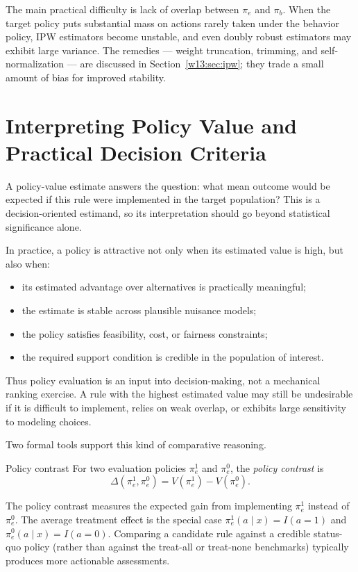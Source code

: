 \documentclass[master.tex]{subfiles}
\begin{document}
The main practical difficulty is lack of overlap between $\pi_e$ and $\pi_b$.  When the target policy puts substantial mass on actions rarely taken under the behavior policy, IPW estimators become unstable, and even doubly robust estimators may exhibit large variance.  The remedies --- weight truncation, trimming, and self-normalization --- are discussed in Section~\ref{w13:sec:ipw}; they trade a small amount of bias for improved stability.

\section{Interpreting Policy Value and Practical Decision Criteria}
\label{w13:sec:interpretation}

A policy-value estimate answers the question: what mean outcome would be expected if this rule were implemented in the target population?  This is a decision-oriented estimand, so its interpretation should go beyond statistical significance alone.

In practice, a policy is attractive not only when its estimated value is high, but also when:
\begin{itemize}
  \item its estimated advantage over alternatives is practically meaningful;
  \item the estimate is stable across plausible nuisance models;
  \item the policy satisfies feasibility, cost, or fairness constraints;
  \item the required support condition is credible in the population of interest.
\end{itemize}
Thus policy evaluation is an input into decision-making, not a mechanical ranking exercise.  A rule with the highest estimated value may still be undesirable if it is difficult to implement, relies on weak overlap, or exhibits large sensitivity to modeling choices.

Two formal tools support this kind of comparative reasoning.

\begin{defn}{Policy contrast}
\label{w13:defn:contrast}
For two evaluation policies $\pi_e^1$ and $\pi_e^0$, the \emph{policy contrast} is
\[
\Delta(\pi_e^1,\pi_e^0)=V(\pi_e^1)-V(\pi_e^0).
\]
\end{defn}

The policy contrast measures the expected gain from implementing $\pi_e^1$ instead of $\pi_e^0$.  The average treatment effect is the special case $\pi_e^1(a\mid x)=I(a=1)$ and $\pi_e^0(a\mid x)=I(a=0)$.  Comparing a candidate rule against a credible status-quo policy (rather than against the treat-all or treat-none benchmarks) typically produces more actionable assessments.
\end{document}
